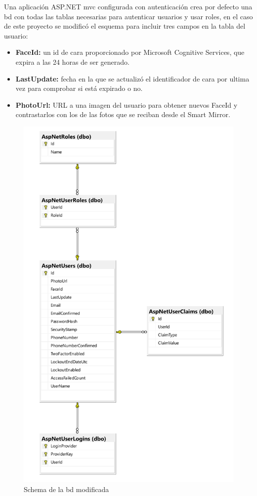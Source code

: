 Una aplicación ASP.NET \acrshort{mvc} configurada con autenticación crea por defecto una \acrshort{bd} con todas las tablas necesarias para autenticar usuarios y usar roles, en el caso de este proyecto se modificó el esquema para incluir tres campos en la tabla del usuario:

\begin{itemize}
\item \textbf{FaceId:} un id de cara proporcionado por Microsoft Cognitive Services, que expira a las 24 horas de ser generado.
\item \textbf{LastUpdate:} fecha en la que se actualizó el identificador de cara por ultima vez para comprobar si está expirado o no.
\item \textbf{PhotoUrl:} URL a una imagen del usuario para obtener nuevos FaceId y contrastarlos con los de las fotos que se reciban desde el Smart Mirror.
\end{itemize}

\begin{figure}[!htp]
	\centering
	\includegraphics[angle=0, page=1, scale=.3]{fig/schema}
	\caption{Schema de la \acrshort{bd} modificada}
\end{figure}

\FloatBarrier
